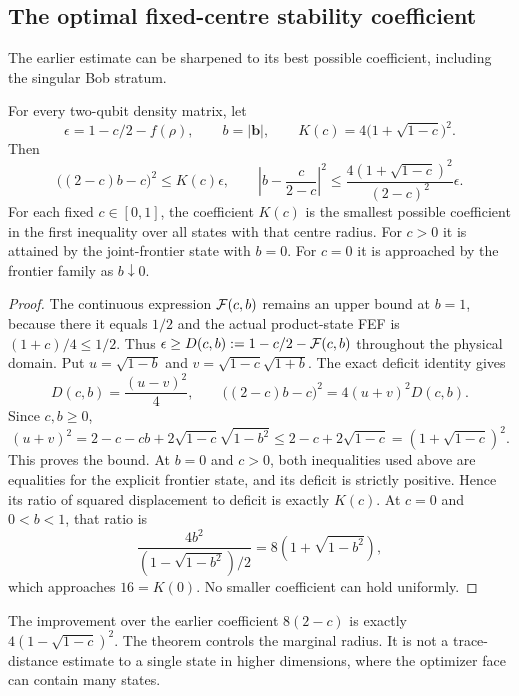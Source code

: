 \subsection{The optimal fixed-centre stability coefficient}
The earlier estimate can be sharpened to its best possible coefficient, including the singular Bob stratum.

\begin{theorem}\label{thm:optimal-stability}
For every two-qubit density matrix, let
\[
 \epsilon=1-c/2-f(\rho),\qquad b=|\bm b|,\qquad
 K(c)=4\bigl(1+\sqrt{1-c}\bigr)^2.
\]
Then
\begin{equation}\label{eq:optimal-stability}
 \boxed{\bigl((2-c)b-c\bigr)^2\le K(c)\epsilon,\qquad
 \left|b-\frac{c}{2-c}\right|^2
 \le\frac{4(1+\sqrt{1-c})^2}{(2-c)^2}\epsilon.}
\end{equation}
For each fixed $c\in[0,1]$, the coefficient $K(c)$ is the smallest possible coefficient in the first inequality over all states with that centre radius. For $c>0$ it is attained by the joint-frontier state with $b=0$. For $c=0$ it is approached by the frontier family as $b\downarrow0$.
\end{theorem}
\begin{proof}
The continuous expression $\mathcal F(c,b)$ remains an upper bound at $b=1$, because there it equals $1/2$ and the actual product-state FEF is $(1+c)/4\le1/2$. Thus $\epsilon\ge D(c,b):=1-c/2-\mathcal F(c,b)$ throughout the physical domain.
Put $u=\sqrt{1-b}$ and $v=\sqrt{1-c}\sqrt{1+b}$. The exact deficit identity gives
\[
 D(c,b)=\frac{(u-v)^2}{4},\qquad
 \bigl((2-c)b-c\bigr)^2=4(u+v)^2D(c,b).
\]
Since $c,b\ge0$,
\[
 (u+v)^2=2-c-cb+2\sqrt{1-c}\sqrt{1-b^2}
 \le2-c+2\sqrt{1-c}=(1+\sqrt{1-c})^2.
\]
This proves the bound. At $b=0$ and $c>0$, both inequalities used above are equalities for the explicit frontier state, and its deficit is strictly positive. Hence its ratio of squared displacement to deficit is exactly $K(c)$.
At $c=0$ and $0<b<1$, that ratio is
\[
 \frac{4b^2}{(1-\sqrt{1-b^2})/2}
       =8(1+\sqrt{1-b^2}),
\]
which approaches $16=K(0)$. No smaller coefficient can hold uniformly.
\end{proof}

The improvement over the earlier coefficient $8(2-c)$ is exactly
$4(1-\sqrt{1-c})^2$. The theorem controls the marginal radius. It is not a trace-distance estimate to a single state in higher dimensions, where the optimizer face can contain many states.
